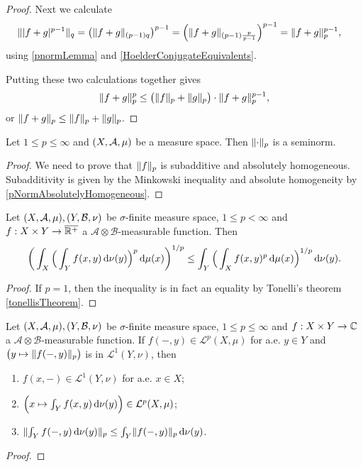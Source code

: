 \begin{proof}
Next we calculate
\begin{align*}
\lVert|f+g|^{p-1}\rVert_q &= \left(\lVert f+g\rVert_{(p-1)q}\right)^{p-1} = \left(\lVert f+g\rVert_{(p-1)\frac{p}{p-1}}\right)^{p-1} = \lVert f+g\rVert_{p}^{p-1},
\end{align*}
using \ref{pnormLemma} and \ref{HoelderConjugateEquivalents}.

Putting these two calculations together gives
\[ \lVert f+g\rVert_p^p \leq \big(\lVert f\rVert_p + \lVert g\rVert_p\big)\cdot \lVert f+g\rVert_{p}^{p-1}, \]
or $\lVert f+g\rVert_p \leq \lVert f\rVert_p + \lVert g\rVert_p$.
\end{proof}
\begin{corollary}
Let $1\leq p \leq \infty$ and $\sSet{X,\mathcal{A},\mu}$ be a measure space. Then $\lVert\cdot\rVert_{p}$ is a seminorm.
\end{corollary}
\begin{proof}
We need to prove that $\lVert f\rVert_{p}$ is subadditive and absolutely homogeneous. Subadditivity is given by the Minkowski inequality and absolute homogeneity by \ref{pNormAbsolutelyHomogeneous}.
\end{proof}

\begin{theorem} \label{MinkowskisIntegralInequality}
Let $\sSet{X,\mathcal{A},\mu}, \sSet{Y,\mathcal{B},\nu}$ be $\sigma$-finite measure space, $1\leq p < \infty$ and $f: X\times Y\to \overline{\mathbb{R}^+}$ a $\mathcal{A}\otimes\mathcal{B}$-measurable function. Then
\[ \bigg(\int_X\Big(\int_Y f(x,y)\operatorname{d \!}{\nu}(y)\Big)^p\operatorname{d \!}{\mu}(x)\bigg)^{1/p} \leq \int_Y\Big(\int_X f(x,y)^p\operatorname{d \!}{\mu}(x)\Big)^{1/p}\operatorname{d \!}{\nu}(y). \]
\end{theorem}
\begin{proof}
If $p=1$, then the inequality is in fact an equality by Tonelli's theorem \ref{tonellisTheorem}.
\end{proof}
\begin{corollary}
Let $\sSet{X,\mathcal{A},\mu}, \sSet{Y,\mathcal{B},\nu}$ be $\sigma$-finite measure space, $1\leq p \leq \infty$ and $f: X\times Y\to \mathbb{C}$ a $\mathcal{A}\otimes\mathcal{B}$-measurable function. If $f(-,y)\in \mathcal{L}^p(X,\mu)$ for a.e. $y\in Y$ and $\big(y\mapsto \lVert f(-,y)\rVert_p\big)$ is in $\mathcal{L}^1(Y,\nu)$, then
\begin{enumerate}
\item $f(x,-)\in \mathcal{L}^1(Y,\nu)$ for a.e. $x\in X$;
\item $\Big(x\mapsto \int_Y f(x,y)\operatorname{d \!}{\nu}(y)\Big)\in \mathcal{L}^p(X,\mu)$;
\item $\lVert\int_Yf(-,y)\operatorname{d \!}{\nu}(y)\rVert_p \leq \int_Y\lVert f(-,y)\rVert_p\operatorname{d \!}{\nu}(y)$.
\end{enumerate}
\end{corollary}
\begin{proof}

\end{proof}



